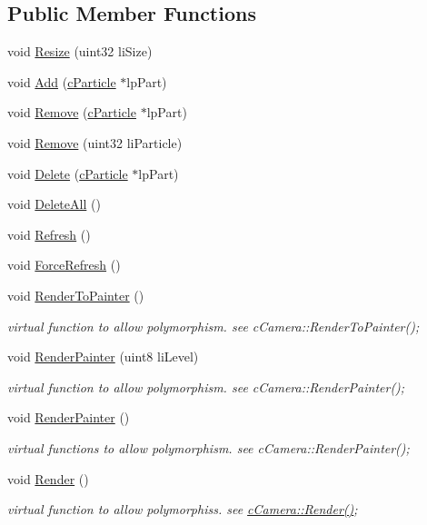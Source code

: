 \subsection*{Public Member Functions}
\begin{DoxyCompactItemize}
\item 
void \hyperlink{classc_particle_handler_a51c07054ca7b054203bc6a9f408f1ab0}{Resize} (uint32 liSize)
\item 
void \hyperlink{classc_particle_handler_a4bc35761a9e607debe3f9ab6d3c09c69}{Add} (\hyperlink{classc_particle}{cParticle} $\ast$lpPart)
\item 
void \hyperlink{classc_particle_handler_aaef41764a47562bfbc7c9155341836f2}{Remove} (\hyperlink{classc_particle}{cParticle} $\ast$lpPart)
\item 
void \hyperlink{classc_particle_handler_aa7ad6d9319e426693d5f08dbc88405d6}{Remove} (uint32 liParticle)
\item 
void \hyperlink{classc_particle_handler_a2a20d9c268a3aa94e4e6ca20535b67e1}{Delete} (\hyperlink{classc_particle}{cParticle} $\ast$lpPart)
\item 
void \hyperlink{classc_particle_handler_a7d626d7c1316d5f36fd7ff0f56d49d7c}{DeleteAll} ()
\item 
void \hyperlink{classc_particle_handler_abbb4154a032ff34db8679e9afb305093}{Refresh} ()
\item 
void \hyperlink{classc_particle_handler_a89857746d88277abf75eea46dadb572f}{ForceRefresh} ()
\item 
void \hyperlink{classc_particle_handler_a8947ed7c9c931bd10a880abcd636b581}{RenderToPainter} ()
\begin{DoxyCompactList}\small\item\em virtual function to allow polymorphism. see cCamera::RenderToPainter(); \item\end{DoxyCompactList}\item 
void \hyperlink{classc_particle_handler_acc9ccbaffa140d31d73007eaaba3c181}{RenderPainter} (uint8 liLevel)
\begin{DoxyCompactList}\small\item\em virtual function to allow polymorphism. see cCamera::RenderPainter(); \item\end{DoxyCompactList}\item 
void \hyperlink{classc_particle_handler_ae1d7ac9b13cb0ca9f43105706a48da01}{RenderPainter} ()
\begin{DoxyCompactList}\small\item\em virtual functions to allow polymorphism. see cCamera::RenderPainter(); \item\end{DoxyCompactList}\item 
void \hyperlink{classc_particle_handler_aab7ecf600c419d2e58f7819fc37e0bb6}{Render} ()
\begin{DoxyCompactList}\small\item\em virtual function to allow polymorphiss. see \hyperlink{classc_camera_acfe96d0953540fa3938e4d415d7cb791}{cCamera::Render()}; \item\end{DoxyCompactList}\end{DoxyCompactItemize}
